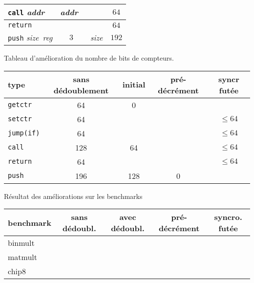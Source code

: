 \documentclass[architecture]{compas2018}
\newcommand{\reg}{\textit{reg}}
\newcommand{\size}{\textit{size}}
\newcommand{\addr}{\textit{addr}}
\begin{document}
\begin{table}[!h]
\begin{center}
\begin{tabular}{|l|c|c|c|}
    \hline
    \texttt{call} \addr   & \addr\             &    & $64$              \\
    \hline
    \texttt{return}       &       &    & $64$              \\
    \hline
    \texttt{push} \size\ \reg          & $3$   & \size           & $192$             \\
    \hline
  \end{tabular}
  \end{center}
Tableau d'amélioration du nombre de bits de compteurs.
  \begin{center}
    \begin{tabular}{|l|c|c|c|c|}
      \hline  
      type   & sans dédoublement  & initial         & pré-décrément & syncr futée    \\
      \hline  
      \hline
      \texttt{getctr}     & 64  & 0   &   &   \\
      \hline
      \texttt{setctr}     & 64  &     &   & $\leqslant 64$ \\
      \hline
      \texttt{jump(if)}   & 64  &     &   & $\leqslant 64$ \\
      \hline
      \texttt{call}       & 128 & 64  &   & $\leqslant 64$ \\
      \hline
      \texttt{return}     & 64  &     &   & $\leqslant64$  \\
      \hline
      \texttt{push}       & 196 & 128 & 0 &  \\
      \hline
    \end{tabular}
  \end{center}
  Résultat des améliorations sur les benchmarks
  \begin{center}
    \begin{tabular}{|l|c|c|c|c|}
      
      \hline  
      benchmark   & sans dédoubl.  & avec dédoubl.  & pré-décrément & syncro. futée    \\
      \hline  
      \hline
      binmult & & & &\\
      \hline
      matmult & & & & \\
      \hline
      chip8 & & & &\\
      \hline
    \end{tabular}
  \end{center}

\end{table}
\end{document}

